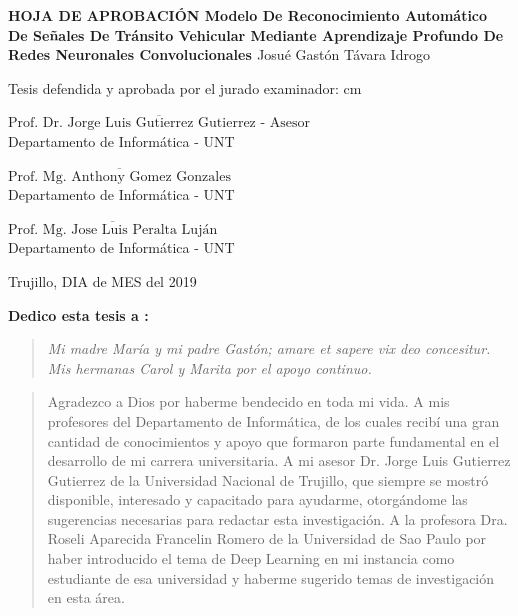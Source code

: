 \begin{center}
 {\bf {\Large HOJA DE APROBACIÓN }     
 \vskip 1.5cm
  {\Large Modelo De Reconocimiento Automático De Señales De Tránsito Vehicular Mediante Aprendizaje Profundo De Redes Neuronales Convolucionales }}
 \vskip 1cm 
  {\large{Josué Gastón Távara Idrogo}}\\

 \vskip 1cm
\end{center} 
Tesis defendida y aprobada por el jurado examinador:
 cm
\begin{flushleft} 
$\overline{\mbox{Prof. Dr. Jorge Luis Gutierrez Gutierrez - Asesor}}$\\
\vskip -0.5cm
Departamento de Informática - UNT
\end{flushleft} 
\vskip 1cm
\begin{flushleft} 
$\overline{\mbox{Prof. Mg. Anthony Gomez Gonzales}}$\\
\vskip -0.5cm
Departamento de Informática - UNT
\end{flushleft} 
\vskip 1cm
\begin{flushleft} 
$\overline{\mbox{Prof. Mg. Jose Luis Peralta Luján}}$\\
\vskip -0.5cm
Departamento de Informática - UNT
\end{flushleft}
\vskip 0.5cm 
\begin{center}    
Trujillo, DIA de MES del 2019
\end{center} 
\newpage


 
 {\bf\Large {Dedico esta tesis a :}}
 \vskip 1cm
  \begin{quotation}
  {\it Mi madre María y mi padre Gastón; amare et sapere vix deo concesitur.
    \vskip 1cm
    Mis hermanas Carol y Marita por el apoyo continuo.
  }
 \end{quotation}


  \newpage
  {\bf\Large {}}
  \vskip 1.5cm
  \begin{quotation}
  Agradezco a Dios por haberme bendecido en toda mi vida.
  \vskip 1cm
  A mis profesores del Departamento de Informática, de los cuales recibí una gran cantidad de conocimientos y apoyo que formaron parte fundamental en el desarrollo de mi carrera universitaria.
  \vskip 1cm
  A mi asesor Dr. Jorge Luis Gutierrez Gutierrez de la Universidad Nacional de Trujillo, que siempre se mostró disponible, interesado y capacitado para ayudarme, otorgándome las sugerencias necesarias para redactar esta investigación.
  \vskip 1cm
  A la profesora Dra. Roseli Aparecida Francelin Romero de la Universidad de Sao Paulo por haber introducido el tema de Deep Learning en mi instancia como estudiante de esa universidad y haberme sugerido temas de investigación en esta área.

  \vskip 1cm
  \end{quotation}



